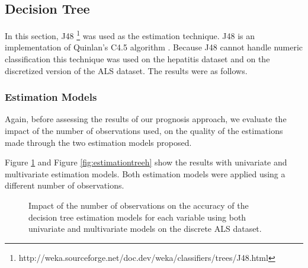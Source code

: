  \subsection{Decision Tree}
\label{subsection:dt}

In this section, J48 \footnote{http://weka.sourceforge.net/doc.dev/weka/classifiers/trees/J48.html} was used as the estimation technique. J48 is an implementation of Quinlan's C4.5 algorithm \cite{Quinlan1993}. Because J48 cannot handle numeric classification this technique was used on the hepatitis dataset and on the discretized version of the ALS dataset. The results were as follows.

\subsubsection{Estimation Models}
\label{subsubsection:estimation_dt}

Again, before assessing the results of our prognosis approach, we evaluate the impact of the number of observations used, on the 
quality of the estimations made through the two estimation models proposed.

Figure \ref{fig:estimationtreeals} and Figure \ref{fig:estimationtreeh} show the results with univariate and multivariate estimation models. Both estimation models were applied using a different number of observations. 
 
 \begin{figure}[h]
 	\begin{subfigmatrix}{2}
 	\end{subfigmatrix}
 	\caption{Impact of the number of observations on the accuracy of the decision tree estimation models for each variable using both univariate and multivariate models on the discrete ALS dataset.}
 	\label{fig:estimationtreeals}
 \end{figure}
 
